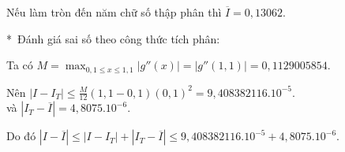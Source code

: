 Nếu làm tròn đến năm chữ số thập phân thì $\overline{I}=0,13062$.\par

*~Đánh giá sai số theo công thức tích phân:\par

Ta có $M=\max_{0,1\leqslant x \leqslant 1,1}\left|g''(x) \right|= \left|g'' \left(1,1\right) \right|= 0,1129005854$.

Nên $\left|I-I_T\right|\leqslant \frac{M}{12}\left(1,1-0,1\right)\left(0,1\right)^2=9,408382116.10^{-5}$.\\
và $\left|I_T-\overline{I}\right| =4,8075.10^{-6}$.

Do đó $\left|I-\overline{I}\right| \leqslant \left| I- I_T \right| + \left| I_T -\overline{I} \right| \leqslant 9,408382116.10^{-5} + 4,8075.10^{-6}$.
